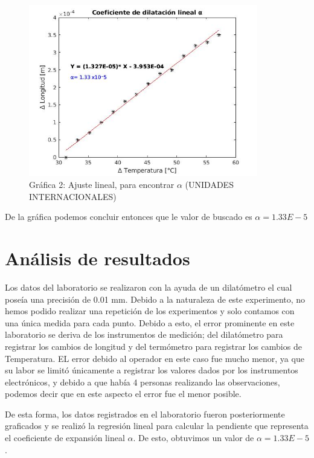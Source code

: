 \documentclass[journal,transmag]{IEEEtran}
\begin{document}
\begin{figure}[!h] 

\center 

\includegraphics[width=10cm]{g2.jpg} 

\caption{Gráfica 2: Ajuste lineal, para encontrar $\alpha$ (UNIDADES INTERNACIONALES)} 

\label{6} 

\end{figure} 

  

De la gráfica podemos concluir entonces que le valor de buscado es $\alpha= 1.33E-5$ 

\section{Análisis de resultados}


Los datos del laboratorio se realizaron con la ayuda de un dilatómetro el cual poseía una precisión de 0.01 mm. Debido a la naturaleza de este experimento, no hemos podido realizar una repetición de los experimentos y solo contamos con una única medida para cada punto. Debido a esto, el error prominente en este laboratorio se deriva de los instrumentos de medición; del dilatómetro para registrar los cambios de longitud y del termómetro para registrar los cambios de Temperatura. EL error debido al operador en este caso fue mucho menor, ya que su labor se limitó únicamente a registrar los valores dados por los instrumentos electrónicos, y debido a que había 4 personas realizando las observaciones, podemos decir que en este aspecto el error fue el menor posible. 

  

De esta forma, los datos registrados en el laboratorio fueron posteriormente graficados y se realizó la regresión lineal para calcular la pendiente que representa el coeficiente de expansión lineal $\alpha $. De esto, obtuvimos un valor de $\alpha= 1.33E-5$ .  
\end{document}
